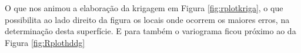   
\hspace*{1.25 cm} O que nos animou a elaboração da krigagem em Figura \ref{fig:rplotkriga}, o que possibilita ao lado direito da figura os locais onde ocorrem os maiores erros, na determinação desta superfície. E para também o variograma ficou próximo ao da Figura \ref{fig:Rplothddg} 
 

